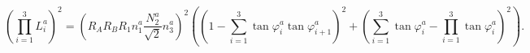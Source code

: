 \begin{equation*}
\left(\prod_{i=1}^3 L^a_i \right)^2=
\left(R_AR_BR_1n^a_1\frac{N^a_2}{\sqrt{2}}n^a_3\right)^2\left(
\left(1-\sum_{i=1}^3\tan\varphi^a_i\tan\varphi^a_{i+1}\right)^2
+\left(\sum_{i=1}^3\tan\varphi^a_i-\prod_{i=1}^3\tan\varphi^a_i\right)^2\right).
\end{equation*}

